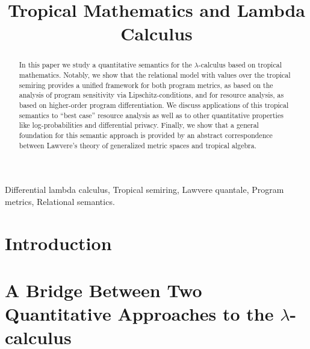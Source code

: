 \documentclass[conference]{IEEEtran}
\begin{document}
\title{Tropical Mathematics and Lambda Calculus}


\maketitle

\begin{abstract}
In this paper we study a quantitative semantics for the $\lambda$-calculus based on tropical mathematics. Notably, we show that the relational model with values over the tropical semiring 
provides a unified framework for both 
program metrics, as based on the analysis of program sensitivity via Lipschitz-conditions, and for resource analysis, as based on higher-order program differentiation.
We discuss applications of this tropical semantics to ``best case'' resource analysis as well as to other quantitative properties like log-probabilities and differential privacy.
Finally, we show that a general foundation for this semantic approach is provided by an abstract correspondence between Lawvere's theory  
of generalized metric spaces and tropical algebra.



\end{abstract}

\begin{IEEEkeywords}
Differential lambda calculus, Tropical semiring, Lawvere quantale, Program metrics, Relational semantics.
\end{IEEEkeywords}

\section{Introduction}



\section{A Bridge Between Two Quantitative Approaches to the $\lambda$-calculus}\label{section2}

\end{document}
